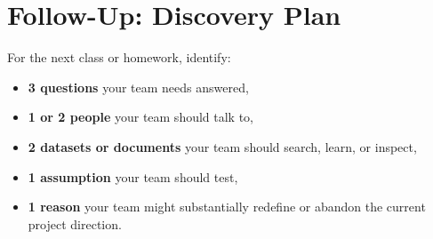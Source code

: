 \documentclass[11pt]{article}
\newcommand{\writearea}[1]{%
\vspace{0.2em}
\fbox{\parbox[t][#1][t]{0.97\textwidth}{\vspace{0.3em}}}
}
\begin{document}
\section*{Follow-Up: Discovery Plan}

For the next class or homework, identify:

\begin{itemize}[leftmargin=*]
    \item \textbf{3 questions} your team needs answered,
    \item \textbf{1 or 2 people} your team should talk to,
    \item \textbf{2 datasets or documents} your team should search, learn, or inspect,
    \item \textbf{1 assumption} your team should test,
    \item \textbf{1 reason} your team might substantially redefine or abandon the current project direction.
\end{itemize}

%
%
\end{document}
